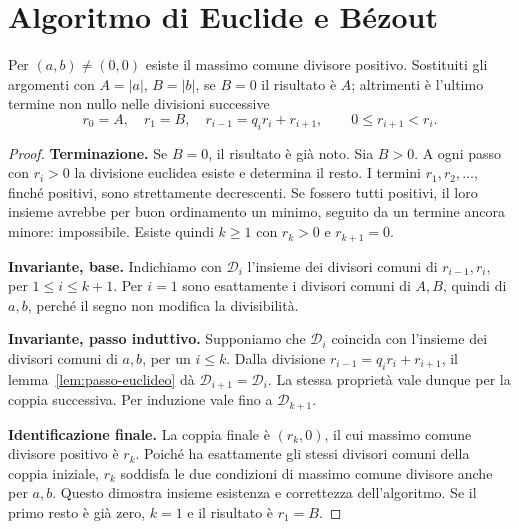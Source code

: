 \section{Algoritmo di Euclide e Bézout}
\begin{teorema}\label{teo:euclide}
Per $(a,b)\ne(0,0)$ esiste il massimo comune divisore positivo. Sostituiti gli argomenti con $A=|a|$, $B=|b|$, se $B=0$ il risultato è $A$; altrimenti è l'ultimo termine non nullo nelle divisioni successive
\[
r_0=A,\quad r_1=B,\quad
r_{i-1}=q_i r_i+r_{i+1},\qquad 0\le r_{i+1}<r_i.
\]
\end{teorema}
\begin{proof}
\textbf{Terminazione.} Se $B=0$, il risultato è già noto. Sia $B>0$. A ogni passo con $r_i>0$ la divisione euclidea esiste e determina il resto. I termini $r_1,r_2,\ldots$, finché positivi, sono strettamente decrescenti. Se fossero tutti positivi, il loro insieme avrebbe per buon ordinamento un minimo, seguito da un termine ancora minore: impossibile. Esiste quindi $k\ge1$ con $r_k>0$ e $r_{k+1}=0$.

\textbf{Invariante, base.} Indichiamo con $\mathcal D_i$ l'insieme dei divisori comuni di $r_{i-1},r_i$, per $1\le i\le k+1$. Per $i=1$ sono esattamente i divisori comuni di $A,B$, quindi di $a,b$, perché il segno non modifica la divisibilità.

\textbf{Invariante, passo induttivo.} Supponiamo che $\mathcal D_i$ coincida con l'insieme dei divisori comuni di $a,b$, per un $i\le k$. Dalla divisione $r_{i-1}=q_i r_i+r_{i+1}$, il lemma~\ref{lem:passo-euclideo} dà $\mathcal D_{i+1}=\mathcal D_i$. La stessa proprietà vale dunque per la coppia successiva. Per induzione vale fino a $\mathcal D_{k+1}$.

\textbf{Identificazione finale.} La coppia finale è $(r_k,0)$, il cui massimo comune divisore positivo è $r_k$. Poiché ha esattamente gli stessi divisori comuni della coppia iniziale, $r_k$ soddisfa le due condizioni di massimo comune divisore anche per $a,b$. Questo dimostra insieme esistenza e correttezza dell'algoritmo. Se il primo resto è già zero, $k=1$ e il risultato è $r_1=B$.
\end{proof}

